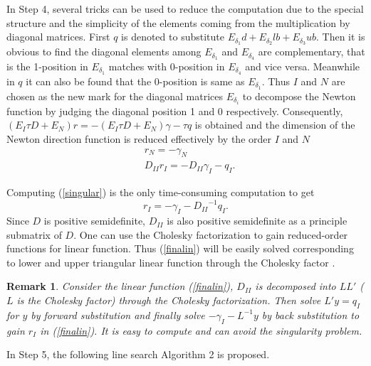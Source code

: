 \documentclass[journal]{IEEEtran}
\newtheorem{remark}{Remark}
\begin{document}
In Step 4, several tricks can be used to reduce the computation due to the special structure and the simplicity of the elements coming from the multiplication by diagonal matrices. First $q$ is denoted  to substitute $ {E_{{\delta _1}}}d + {E_{{\delta _2}}}lb + {E_{{\delta _3}}}ub$. Then it is obvious to find the diagonal elements among ${E_{{\delta _1}}}$ and ${E_{{\delta _4}}}$ are complementary, that is the 1-position in ${E_{{\delta _1}}}$ matches with 0-position in ${E_{{\delta _4}}}$ and vice versa. Meanwhile in $q$ it can also be found that the 0-position is same as ${E_{{\delta _1}}}$. Thus $I$ and $N$ are chosen as the new mark for the diagonal matrices $E_{\delta _i}$ to decompose the Newton function by judging the diagonal position 1 and 0 respectively. Consequently, $({E_I}\tau D + {E_N})r =  - ({E_I}\tau D + {E_N})\gamma  - \tau q$ is obtained and the dimension of the Newton direction function is reduced effectively by the order $I$ and $N$
\begin{subequations}\label{decom}
	\begin{align}
	& r_N =  - {\gamma _N}\\
	& {D_{II}}{r_I} =  - {D_{II}}{\gamma _I} - {q_I}.\label{singular}
	\end{align}
\end{subequations}

Computing (\ref{singular}) is the only time-consuming computation to get
\begin{equation}\label{finalin}
{r_I} =  - {\gamma _I} - {D_{II}}^{ - 1}{q_I}.
\end{equation}
Since $D$ is positive semidefinite, $D_{II}$ is also positive semidefinite as a principle submatrix of $D$. One can use the Cholesky factorization to gain reduced-order functions for linear function. Thus (\ref{finalin}) will be easily solved corresponding to lower and upper triangular linear function through the Cholesky factor  \cite{li1998regularized}.

\begin{remark}\label{rmk1}
	Consider the linear function (\ref{finalin}), $D_{II}$ is decomposed into $LL'$ ($L$ is the Cholesky factor) through the Cholesky factorization. Then solve $L'y=q_I$ for $y$ by forward substitution and finally solve $-\gamma_I - L^{-1}y$ by back substitution to gain $r_I$ in (\ref{finalin}). It is easy to compute and can avoid the singularity problem.
\end{remark}

In Step 5, the following line search Algorithm 2 is proposed.
\end{document}
